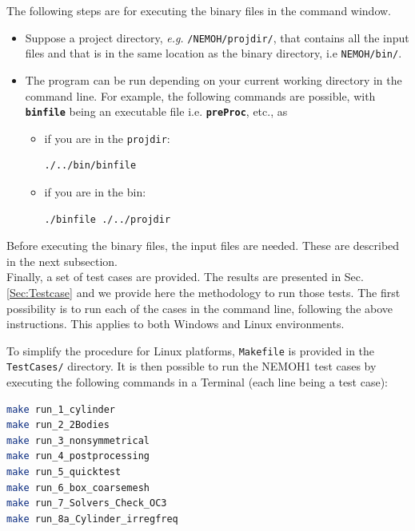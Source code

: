 \documentclass[12pt,a4paper,titlepage]{article}
\begin{document}
The following steps are for executing the binary files in the command window.
\begin{itemize}
\item Suppose a project directory, \emph{e.g.} \texttt{/NEMOH/projdir/}, that contains all the input files and that is in the same location as the binary directory, i.e \texttt{NEMOH/bin/}. 
\item The program can be run depending on your current working directory in the command line. For example, the following commands are possible, with \texttt{\textbf{binfile}} being an executable file i.e. \texttt{\textbf{preProc}}, etc., as
\begin{itemize}
\item if you are in the \texttt{projdir}:
\begin{lstlisting}[language=bash,keywordstyle=\color{blue},basicstyle=\ttfamily\footnotesize,backgroundcolor=\color{lightgray}]
    ./../bin/binfile
\end{lstlisting}
\item if you are in the {bin}:
\begin{lstlisting}[language=bash,keywordstyle=\color{blue},basicstyle=\ttfamily\footnotesize,backgroundcolor=\color{lightgray}]
    ./binfile ./../projdir
\end{lstlisting}
\end{itemize}
\end{itemize}

Before executing the binary files, the input files are needed. These are described in the next subsection.\\

Finally, a set of test cases are provided. The results are presented in Sec. \ref{Sec:Testcase} and we provide here the methodology to run those tests. The first possibility is to run each of the cases in the command line, following the above instructions. This applies to both Windows and Linux environments.

To simplify the procedure for Linux platforms, \texttt{Makefile} is provided in the \texttt{TestCases/} directory. It is then possible to run the NEMOH1 test cases by executing the following commands in a Terminal (each line being a test case):
\begin{lstlisting}[language=bash,keywordstyle=\color{blue},basicstyle=\ttfamily\footnotesize,backgroundcolor=\color{lightgray}]
make run_1_cylinder
make run_2_2Bodies
make run_3_nonsymmetrical
make run_4_postprocessing
make run_5_quicktest
make run_6_box_coarsemesh
make run_7_Solvers_Check_OC3
make run_8a_Cylinder_irregfreq
\end{lstlisting}
\end{document}
